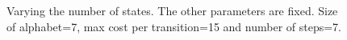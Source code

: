 \begin{figure}[H]



 \caption{Varying the number of states. The other parameters are fixed. Size of alphabet=7, max cost per transition=15 and number of steps=7.}\label{fig:states}
\end{figure}
